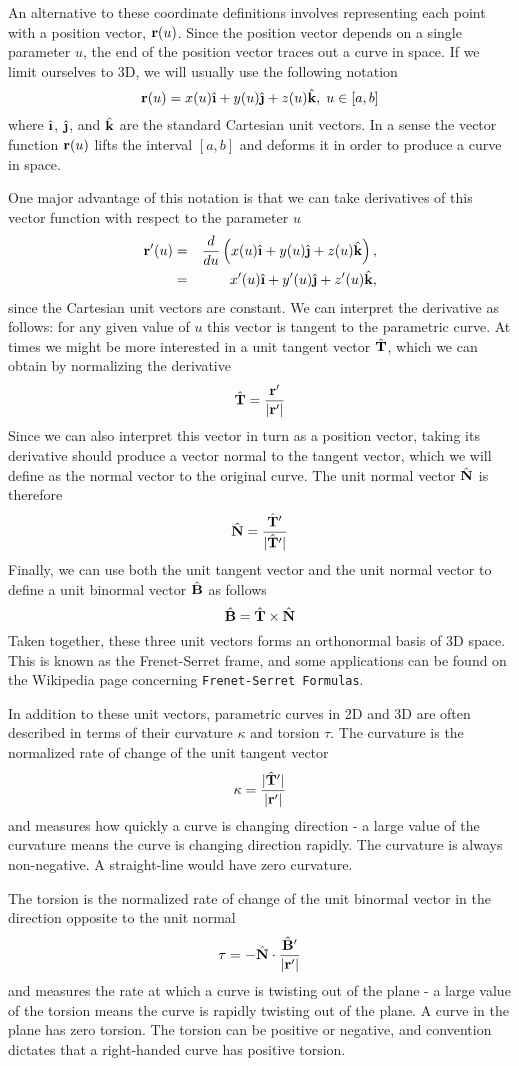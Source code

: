 \documentclass[M3_Night1_Solutions]{subfiles}
\begin{document}
An alternative to these coordinate definitions involves representing each point with a position vector, $\mathbf{r}(u)$. Since the position vector depends on a single parameter $u$, the end of the position vector traces out a curve in space. If we limit ourselves to 3D, we will usually use the following notation
\[ \r(u) = x(u) \ihat + y(u) \jhat + z(u) \khat, \; u \in [a,b]\]
where $\ihat$, $\jhat$, and $\hat{\mathbf{k}}$ are the standard Cartesian unit vectors. In a sense the vector function $\mathbf{r}(u)$ lifts the interval $[a,b]$ and deforms it in order to produce a curve in space.

One major advantage of this notation is that we can take derivatives of this vector function with respect to the parameter $u$
\begin{eqnarray*}
\r'(u) &=& \frac{d}{du} \left(x(u) \ihat + y(u) \jhat + z(u) \khat \right), \\
&=& x'(u) \ihat + y'(u) \jhat + z'(u) \khat,
\end{eqnarray*}
since the Cartesian unit vectors are constant. We can interpret the derivative as follows: for any given value of $u$ this vector is tangent to the parametric curve. At times we might be more interested in a unit tangent vector $\hat{\mathbf{T}}$, which we can obtain by normalizing the derivative
\[ \hat{\mathbf{T}} = \frac{\mathbf{r}'}{|\mathbf{r}'|} \]
Since we can also interpret this vector in turn as a position vector, taking its derivative should produce a vector normal to the tangent vector, which we will define as the normal vector to the original curve. The unit normal vector $\hat{\mathbf{N}}$ is therefore
\[ \hat{\mathbf{N}} = \frac{\hat{\mathbf{T}}'}{|\hat{\mathbf{T}}'|} \]
Finally, we can use both the unit tangent vector and the unit normal vector to define a unit binormal vector $\hat{\mathbf{B}}$ as follows
\[\hat{\mathbf{B}} = \hat{\mathbf{T}} \times \hat{\mathbf{N}} \]
Taken together, these three unit vectors forms an orthonormal basis of 3D space. This is known as the Frenet-Serret frame, and some applications can be found on the Wikipedia page concerning {\tt Frenet-Serret Formulas}.

In addition to these unit vectors, parametric curves in 2D and 3D are often described in terms of their curvature $\kappa$ and torsion $\tau$. The curvature is the normalized rate of change of the unit tangent vector
\[\kappa = \frac{|\hat{\mathbf{T}}'|}{|\mathbf{r}'|} \]
and measures how quickly a curve is changing direction - a large value of the curvature means the curve is changing direction rapidly. The curvature is always non-negative. A straight-line would have zero curvature.

The torsion is the normalized rate of change of the unit binormal vector in the direction opposite to the unit normal
\[\tau = -\hat{\mathbf{N}} \cdot \frac{\hat{\mathbf{B}}'}{|\mathbf{r}'|} \]
and measures the rate at which a curve is twisting out of the plane - a large value of the torsion means the curve is rapidly twisting out of the plane. A curve in the plane has zero torsion. The torsion can be positive or negative, and convention dictates that a right-handed curve has positive torsion.
\end{document}
